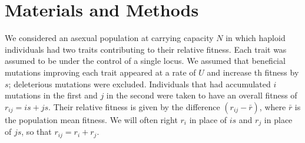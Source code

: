 \documentclass[11pt,twocolumn]{article}
\begin{document}
\section{Materials and Methods}
\label{sec:materials:methods}

We considered an asexual population at carrying capacity $N$ in which haploid individuals had two traits contributing to their relative fitness. Each trait was assumed to be under the control of a single locus. We assumed that beneficial mutations improving each trait appeared at a rate of $U$ and increase th fitness by $s$; deleterious mutations were excluded. Individuals that had accumulated $i$ mutations in the first and $j$ in the second were taken to have an overall fitness of $r_{ij} = i s+j s$.  Their relative fitness is given by the difference $(r_{ij}-\bar{r})$, where  $\bar{r} $  is the population mean fitness.  We will often right $r_i$ in place of $i s$ and $r_j$ in place of $j s$, so that $r_{ij} = r_i + r_j$. 
% 
% 
% 
%
\end{document}
